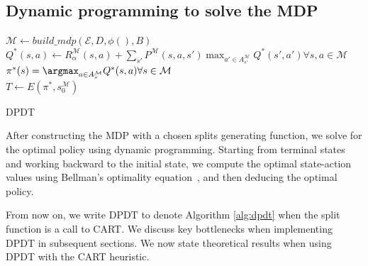 \subsection{Dynamic programming to solve the MDP}
        \begin{algorithm}
            $\mathcal{M} \gets build\_mdp(\mathcal{E}, D, \phi(), B)$\label{line:build_mdp} \\
            $Q^*(s,a) \gets R_{\alpha}^{\mathcal{M}}(s,a) + \sum_{s'} P^{\mathcal{M}}(s,a,s') \max_{a' \in A_{s'}^{\mathcal{M}}} Q^*(s',a') \forall s,a \in \mathcal{M}$\\
            $\pi^*(s) = \argmax_{a \in A_s^{\mathcal{M}}} Q^*(s, a) \forall s \in \mathcal{M} $\\
            $T \gets E(\pi^*,s_0^{\mathcal{M}}) $
            \caption{DPDT}\label{alg:dpdt}
        \end{algorithm}
        
After constructing the MDP with a chosen splits generating function, we solve for the optimal policy using dynamic programming. Starting from terminal states and working backward to the initial state, we compute the optimal state-action values using Bellman's optimality equation~\cite{BELLMAN1958228}, and then deducing the optimal policy.

From now on, we write DPDT to denote Algorithm \ref{alg:dpdt} when the split function is a call to CART. We discuss key bottlenecks when implementing DPDT in subsequent sections. We now state theoretical results when using DPDT with the CART heuristic. 

